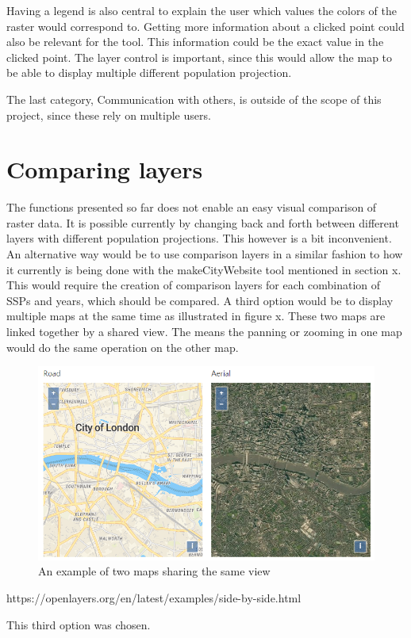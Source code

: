 Having a legend is also central to explain the user which values the colors of the raster would correspond to. Getting more information about a clicked point could also be relevant for the tool. This information could be the exact value in the clicked point. The layer control is important, since this would allow the map to be able to display multiple different population projection.

The last category, Communication with others, is outside of the scope of this project, since these rely on multiple users. %




\section{Comparing layers}

The functions presented so far does not enable an easy visual comparison of raster data. It is possible currently by changing back and forth between different layers with different population projections. This however is a bit inconvenient. 
An alternative way would be to use comparison layers in a similar fashion to how it currently is being done with the makeCityWebsite tool mentioned in section x. This would require the creation of comparison layers for each combination of SSPs and years, which should be compared.   
A third option would be to display multiple maps at the same time as illustrated in figure x. These two maps are linked together by a shared view. The means the panning or zooming in one map would do the same operation on the other map.

\begin{figure} [H]
	\centering
	\includegraphics[width=.8\textwidth]{Pictures/DualMapExample}
	\caption{An example of two maps sharing the same view}
	\label{DualMapExample}
\end{figure}
https://openlayers.org/en/latest/examples/side-by-side.html

This third option was chosen.
 
